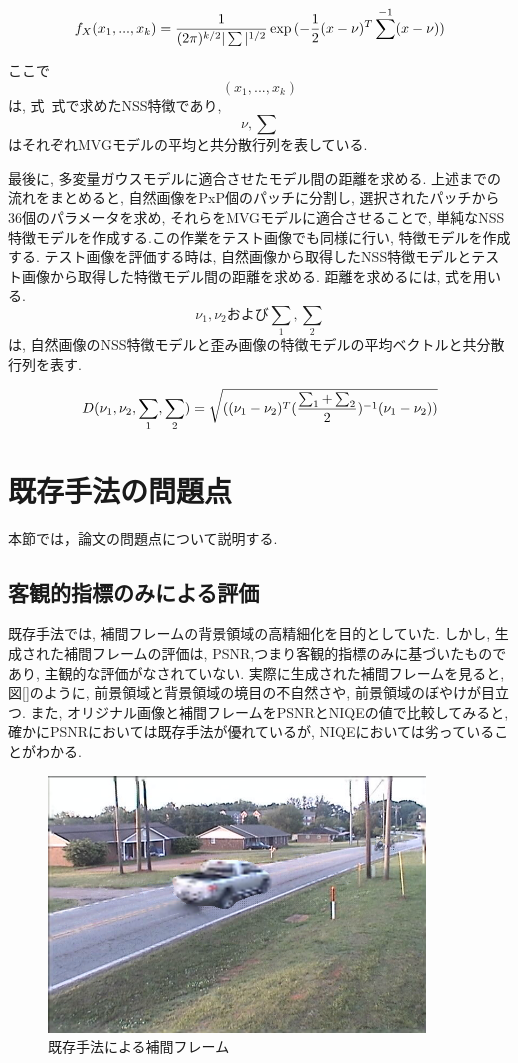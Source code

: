 \documentclass[a4paper,12pt]{jsreport}
\begin{document}
\begin{equation}
 f_X(x_1, ..., x_k) = \frac{1}{(2\pi)^{k/2}|\sum|^{1/2}}\exp{(-\frac{1}{2}(x-\nu)^T\sum^{-1}(x-\nu))}\\ 
\end{equation}

ここで$$(x_1, ... , x_k)$$は, 式~式で求めたNSS特徴であり, $$\nu, \sum$$はそれぞれMVGモデルの平均と共分散行列を表している.


最後に, 多変量ガウスモデルに適合させたモデル間の距離を求める. 
上述までの流れをまとめると, 自然画像をPxP個のパッチに分割し, 選択されたパッチから36個のパラメータを求め, それらをMVGモデルに適合させることで, 単純なNSS特徴モデルを作成する.この作業をテスト画像でも同様に行い, 特徴モデルを作成する. 
テスト画像を評価する時は, 自然画像から取得したNSS特徴モデルとテスト画像から取得した特徴モデル間の距離を求める. 距離を求めるには, 式を用いる.
$$\nu_1, \nu_2および\sum_1, \sum_2$$は, 自然画像のNSS特徴モデルと歪み画像の特徴モデルの平均ベクトルと共分散行列を表す. 

\begin{equation}
 D(\nu_1,\nu_2,\sum_1,\sum_2) = \sqrt{((\nu_1-\nu_2)^T(\frac{\sum_1+\sum_2}{2})^{-1}(\nu_1-\nu_2))}\\ 
\end{equation}




\section{既存手法の問題点}
本節では，論文\cite{Ukihashi}の問題点について説明する.

\subsection{客観的指標のみによる評価}
既存手法では, 補間フレームの背景領域の高精細化を目的としていた. しかし, 生成された補間フレームの評価は, PSNR,つまり客観的指標のみに基づいたものであり, 主観的な評価がなされていない.  実際に生成された補間フレームを見ると, 図[]のように, 前景領域と背景領域の境目の不自然さや, 前景領域のぼやけが目立つ. また, オリジナル画像と補間フレームをPSNRとNIQEの値で比較してみると, 確かにPSNRにおいては既存手法が優れているが, NIQEにおいては劣っていることがわかる. 
\begin{figure}[h]
  \begin{center}
    \includegraphics[width=10cm]{./ukihashi_method.bmp}
    \caption{既存手法による補間フレーム}
  \end{center}
\end{figure}
\end{document}
